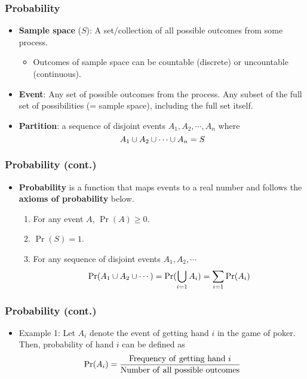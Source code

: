 \documentclass[pdflatex, 12pt]{beamer}
\begin{document}
\begin{frame}
\frametitle{Probability}
\begin{itemize}
\item \textbf{Sample space} ($S$): A set/collection of all possible outcomes from some process. 
 \begin{itemize}
 \item Outcomes of sample space can be countable (discrete) or uncountable (continuous).
 \end{itemize}
\vspace{0.4cm}
\item \textbf{Event}: Any set of possible outcomes from the process. Any subset of the full set of possibilities (= sample space), including the full set itself.
\vspace{0.4cm}
\item \textbf{Partition}: a sequence of disjoint events $A_1, A_2, \cdots, A_n$ where
 \begin{equation}
 A_1 \cup A_2 \cup \cdots \cup A_n = S \notag
 \end{equation}
\end{itemize}
\end{frame}

\begin{frame}
\frametitle{Probability (cont.)}
\begin{itemize}
\item \textbf{Probability} is a function that maps events to a real number and follows the \textbf{axioms of probability} below.
 \begin{enumerate}
 \item For any event $A$, $\Pr(A) \geq 0$.
 \item $\Pr(S) = 1$.
 \item For any sequence of disjoint events $A_1, A_2, \cdots$
  \begin{equation}
  \Pr(A_1 \cup A_2 \cup \cdots ) = \Pr(\bigcup_{i = 1} A_i) = \sum_{i = 1} \Pr(A_i) \notag
  \end{equation}
 \end{enumerate}
\end{itemize}
\end{frame}

\begin{frame}
\frametitle{Probability (cont.)}
\begin{itemize}
\item Example 1: Let $A_i$ denote the event of getting hand $i$ in the game of poker. Then, probability of hand $i$ can be defined as 
 \begin{equation}
 \Pr(A_i) = \frac{\mathrm{Frequency \ of\ getting \ hand \ }i}{\mathrm{Number \ of\ all \ possible \ outcomes}} \notag
 \end{equation}
\end{itemize}
\end{frame}
\end{document}
